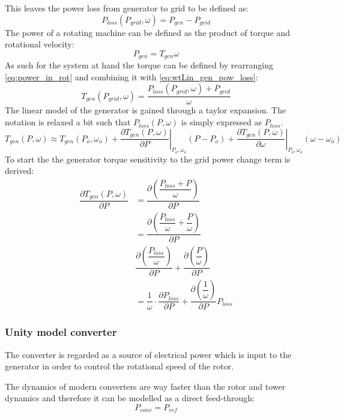 This leaves the power loss from generator to grid to be defined as:
\begin{equation}\label{eq_wtLin_gen_pow_loss}
	P_{loss}(P_{grid}, \omega) = P_{gen} - P_{grid}%
\end{equation}
The power of a rotating machine can be defined as the product of torque and rotational velocity:
\begin{equation}\label{eq:wtLin_power_in_rot}
	P_{gen} = T_{gen} \omega
\end{equation}
As such for the system at hand the torque can be defined by rearranging \cref{eq:power_in_rot} and combining it with \cref{eq:wtLin_gen_pow_loss}:
\begin{equation}\label{key}
	T_{gen}(P_{grid}, \omega) = \dfrac{P_{loss}(P_{grid}, \omega) + P_{grid}}{\omega}
\end{equation}
The linear model of the generator is gained through a taylor expansion. The notation is relaxed a bit such that $ P_{loss}(P, \omega) $ is simply expressed as $ P_{loss} $.
\begin{equation}\label{eq:wtLin_taylor}
	T_{gen}(P, \omega) \approx T_{gen}(P_o, \omega_o) + 
	\left. \dfrac{\partial T_{gen}(P, \omega)}{\partial P} \right |_{P_o,\omega_o} (P-P_o) + 
	\left. \dfrac{\partial T_{gen}(P, \omega)}{\partial \omega} \right |_{P_o,\omega_o} (\omega - \omega_o)
\end{equation}
To start the the generator torque sensitivity to the grid power change term is derived:
\begin{align}\label{eq:wtLin_gen_1}
	\dfrac{\partial T_{gen}(P, \omega)}{\partial P} &= \dfrac{\partial \left (\dfrac{P_{loss} + P}{\omega}\right )}{\partial P} \\
	& = \dfrac{\partial \left ( \dfrac{P_{loss}}{\omega} + \dfrac{P}{\omega} \right )}{\partial P} \\
	& \dfrac{\partial \left (\dfrac{P_{loss}}{\omega} \right )}{\partial P} + \dfrac{\partial \left ( \dfrac{P}{\omega} \right )}{\partial P} \\
	& = \dfrac{1}{\omega} \cdot \dfrac{\partial P_{loss}}{\partial P} + \dfrac{\partial \left ( \dfrac{1}{\omega} \right )}{\partial P} P_{loss}
\end{align}



\subsubsection{Unity model converter}
The converter is regarded as a source of electrical power which is input to the generator in order to control the rotational speed of the rotor.

The dynamics of modern converters are way faster than the rotor and tower dynamics and therefore it can be modelled as a direct feed-through:
\begin{equation}\label{eq:}
	P_{conv} = P_{ref}
\end{equation}



%	

